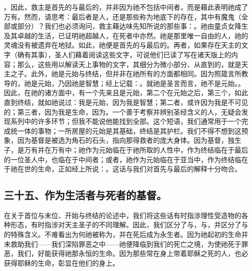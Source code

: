 。因此，救主是首先的与最后的，并非因为祂不包括中间者，而是藉此表明祂成了万有。然而，请思考：最后者是人，还是那些称为地底下的存在，其中有魔鬼（全部或部分）？我们也必须询问，救主藉达味先知所说的那些事：。祂由童贞女降生及其卓越的生活，已证明祂超越人，在死者中亦然。祂是那里唯一自由的人，祂的灵魂没有被遗弃在地狱。如此，祂便是首先的与最后的。再者，如果存在天主的文字（确有其事），圣人们藉着阅读这些文字，可说他们已读了写在诸天版上的内容；那么，这些用以解读天上事物的文字，其细分为微小部分、从直到的，就是天主之子。此外，祂是元始与终结，但并非在祂所有的方面都相同。因为照箴言所教导的，祂是元始，乃因祂是智慧；经上记载：。就祂是圣言而言，祂不是元始。。因此，在祂的诸方面中，有一个先来且是元始，第二个在元始之后，第三个，如此直到终结，就如祂说过：我是元始，因为我是智慧；第二者，或许因为我是不可见的；第三者，因为我是生命，因为。一个善于考察并辨别圣经含义的人，无疑会发现系列中的许多环节；但我不能说他能找到全部。这个短语，我们通常用于一个完成统一体的事物；一所房屋的元始是其基础，终结是其护栏。我们不得不想到这预象，因为基督是被选为角石的石头，指向那得救者的庞大身体。因为基督，独生子，是万有并在万有中；祂作为元始临在于祂所取的人性中，作为终结临在于最后的一位圣人中，也临在于中间者；或者，祂作为元始临在于亚当中，作为终结临在于祂在世的生命，正如经上所说：。这话与我们对首先与最后的解释十分吻合。\par


\subsection{三十五、作为生活者与死者的基督。}

在关于首位与末位、开始与终结的论述中，我们将这些话有时指涉理性受造物的各种形态，有时指涉对天主圣子的不同理解。因此，我们区分了与，与，并区分了与的特殊含义。不难看出为何祂被称为，并在死后成为永生者。因为祂起初的生命并未救助我们——我们深陷罪恶之中——祂便降临到我们的死亡之境，为使祂死于罪恶，我们，好能获得祂那永恒的生命。因为那些常在身上带着耶稣之死的人，也必获得耶稣的生命，彰显在他们的身上。\par

